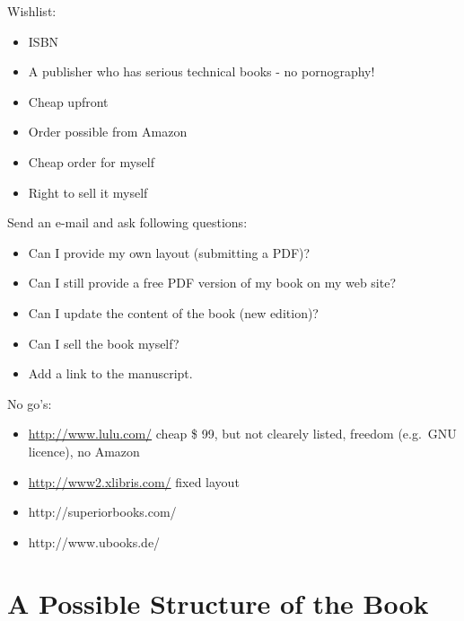 Wishlist:
\begin{itemize}
    \item ISBN
    \item A publisher who has serious technical books - no pornography!
    \item Cheap upfront
    \item Order possible from Amazon
    \item Cheap order for myself
    \item Right to sell it myself
\end{itemize}

Send an e-mail and ask following questions:
\begin{itemize}
    \item Can I provide my own layout (submitting a PDF)?
    \item Can I still provide a free PDF version of my book on my
    web site?
    \item Can I update the content of the book (new edition)?
    \item Can I sell the book myself?
    \item Add a link to the manuscript.
\end{itemize}

No go's:
\begin{itemize}
    \item \url{http://www.lulu.com/} cheap \$ 99, but not clearely
    listed, freedom (e.g.\ GNU licence), no Amazon
    \item \url{http://www2.xlibris.com/} fixed layout
    \item http://superiorbooks.com/
    \item http://www.ubooks.de/
\end{itemize}



\section{A Possible Structure of the Book}

